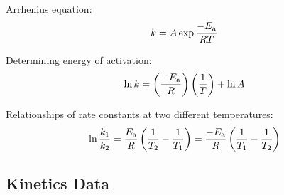 \documentclass[10pt]{article}
\begin{document}

Arrhenius equation:
\begin{equation*}
k = A \exp{\frac{-E_\textnormal{a}}{RT}}
\end{equation*}

Determining energy of activation:
\begin{equation*}
\ln k = \left(\frac{-E_\textnormal{a}}{R}\right)\left(\frac{1}{T}\right) + \ln A
\end{equation*}

Relationships of rate constants at two different temperatures:
\begin{equation*}
\ln \frac{k_1}{k_2} = \frac{E_\textnormal{a}}{R}\left(\frac{1}{T_2} - \frac{1}{T_1}\right) = \frac{-E_\textnormal{a}}{R}\left(\frac{1}{T_1}-\frac{1}{T_2}\right)
\end{equation*}

\subsection{Kinetics Data}
\end{document}
